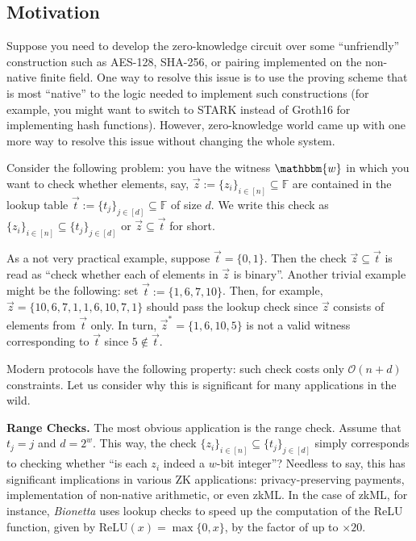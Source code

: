 \documentclass[../../book]{subfiles}
\begin{document}
\subsection{Motivation}

Suppose you need to develop the zero-knowledge circuit over some ``unfriendly''
construction such as AES-128, SHA-256, or pairing implemented on the non-native
finite field. One way to resolve this issue is to use the proving scheme that is
most ``native'' to the logic needed to implement such constructions (for
example, you might want to switch to STARK instead of Groth16 for implementing
hash functions). However, zero-knowledge world came up with one more way to
resolve this issue without changing the whole system.

Consider the following problem: you have the witness $\mathbbm{w}$ in which you
want to check whether elements, say, $\vec{z} := \{z_i\}_{i \in [n]} \subseteq
\mathbb{F}$ are contained in the lookup table $\vec{t} := \{t_j\}_{j \in [d]}
\subseteq \mathbb{F}$ of size $d$. We write this check as $\{z_i\}_{i \in [n]}
\subseteq \{t_j\}_{j \in [d]}$ or $\vec{z} \subseteq \vec{t}$ for short.

\begin{example}
    As a not very practical example, suppose $\vec{t} = \{0,1\}$. Then the check
    $\vec{z} \subseteq \vec{t}$ is read as ``check whether each of elements in
    $\vec{z}$ is binary''. Another trivial example might be the following: set
    $\vec{t} := \{1,6,7,10\}$. Then, for example, $\vec{z} =
    \{10,6,7,1,1,6,10,7,1\}$ should pass the lookup check since $\vec{z}$
    consists of elements from $\vec{t}$ only. In turn, $\vec{z}^*=\{1,6,10,5\}$
    is not a valid witness corresponding to $\vec{t}$ since $5 \not\in \vec{t}$.
\end{example}

Modern protocols have the following property: such check costs only
$\mathcal{O}(n+d)$ constraints. Let us consider why this is significant for many
applications in the wild.

\textbf{Range Checks.} The most obvious application is the range check. Assume
that $t_j=j$ and $d=2^w$. This way, the check $\{z_i\}_{i \in [n]} \subseteq
\{t_j\}_{j \in [d]}$ simply corresponds to checking whether ``is each $z_i$
indeed a $w$-bit integer''? Needless to say, this has significant implications
in various ZK applications: privacy-preserving payments, implementation of
non-native arithmetic, or even zkML. In the case of zkML, for instance,
\textit{Bionetta} uses lookup checks to speed up the computation of the ReLU
function, given by $\text{ReLU}(x) = \max\{0,x\}$, by the factor of up to
$\times 20$.
\end{document}
